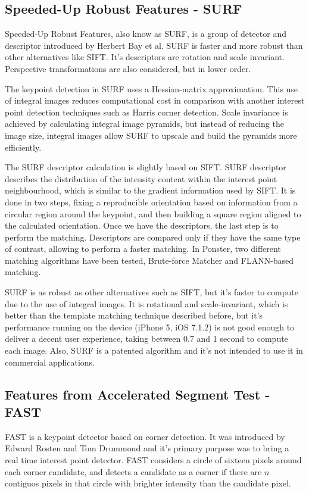 \subsection{Speeded-Up Robust Features - SURF}
Speeded-Up Robust Features, also know as SURF, is a group of detector and descriptor
introduced by Herbert Bay et al. SURF is faster and more robust than other
alternatives like SIFT\cite{Bay:2008:SRF:1370312.1370556}. It's descriptors are rotation and scale invariant.
Perspective transformations are also considered, but in lower order. 

The keypoint detection in SURF uses a Hessian-matrix approximation. This use of
integral images reduces computational cost in comparison with another interest point
detection techniques such as Harris corner detection. Scale invariance is achieved
by calculating integral image pyramids, but instead of reducing the image size,
integral images allow SURF to upscale and build the pyramids more efficiently. 

The SURF descriptor calculation is slightly based on SIFT. SURF descriptor describes
the distribution of the intensity content within the interest point neighbourhood,
which is similar to the gradient information used by SIFT. It is done in two steps,
fixing a reproducible orientation based on information from a circular region around
the keypoint, and then building a square region aligned to the calculated
orientation. Once we have the descriptors, the last step is to perform the
matching. Descriptors are compared only if they have the same type of contrast,
allowing to perform a faster matching. In Ponster, two different matching algorithms
have been tested, Brute-force Matcher and FLANN-based matching.

SURF is as robust as other alternatives such as SIFT, but it's faster to compute due
to the use of integral images. It is rotational and scale-invariant, which is better
than the template matching technique described before, but it's performance running
on the device (iPhone 5, iOS 7.1.2) is not good enough to deliver a decent user
experience, taking between 0.7 and 1 second to compute each image. Also, SURF is a
patented algorithm and it's not intended to use it in commercial applications. 

\subsection{Features from Accelerated Segment Test - FAST}
FAST is a keypoint detector based on corner detection. It was introduced by
Edward Rosten and Tom Drummond\cite{Rosten:2006:MLH:2094437.2094478} and it's primary purpose was to bring a real
time interest point detector. FAST considers a circle of sixteen pixels around
each corner candidate, and detects a candidate as a corner if there are $n$
contiguos pixels in that circle with brighter intensity than the candidate
pixel. %


